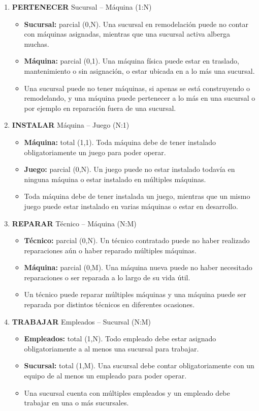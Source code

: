 \documentclass[12pt]{article}
\begin{document}
\begin{enumerate}
    \item \textbf{PERTENECER} Sucursal -- Máquina (1:N)
    \begin{itemize}
        \item \textbf{Sucursal:} parcial (0,N). Una sucursal en remodelación puede no contar con máquinas asignadas, mientras que una sucursal activa alberga muchas.
        \item \textbf{Máquina:} parcial (0,1). Una máquina física puede estar en traslado, mantenimiento o sin asignación, o estar ubicada en a lo más una sucursal.
        \item Una sucursal puede no tener máquinas, si apenas se está construyendo o remodelando, y una máquina puede pertenecer a lo más en una sucursal o por ejemplo en reparación fuera de una sucursal.
    \end{itemize}

    \item \textbf{INSTALAR} Máquina -- Juego (N:1)
    \begin{itemize}
        \item \textbf{Máquina:} total (1,1). Toda máquina debe de tener instalado obligatoriamente un juego para poder operar.
        \item \textbf{Juego:} parcial (0,N). Un juego puede no estar instalado todavía en ninguna máquina o estar instalado en múltiples máquinas.
        \item Toda máquina debe de tener instalada un juego, mientras que un mismo juego puede estar instalado en varias máquinas o estar en desarrollo.
    \end{itemize}

    \item \textbf{REPARAR} Técnico -- Máquina (N:M)
    \begin{itemize}
        \item \textbf{Técnico:} parcial (0,N). Un técnico contratado puede no haber realizado reparaciones aún o haber reparado múltiples máquinas.
        \item \textbf{Máquina:} parcial (0,M). Una máquina nueva puede no haber necesitado reparaciones o ser reparada a lo largo de su vida útil.
        \item Un técnico puede reparar múltiples máquinas y una máquina puede ser reparada por distintos técnicos en diferentes ocasiones.
    \end{itemize}

    \item \textbf{TRABAJAR} Empleados -- Sucursal (N:M)
    \begin{itemize}
        \item \textbf{Empleados:} total (1,N). Todo empleado debe estar asignado obligatoriamente a al menos una sucursal para trabajar.
        \item \textbf{Sucursal:} total (1,M). Una sucursal debe contar obligatoriamente con un equipo de al menos un empleado para poder operar.
        \item Una sucursal cuenta con múltiples empleados y un empleado debe trabajar en una o más sucursales.
    \end{itemize}


\end{enumerate}
\end{document}
